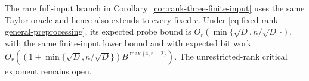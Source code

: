 The rare full-input branch in
Corollary~\ref{cor:rank-three-finite-input} uses the same Taylor
oracle and hence also extends to every fixed $r$. Under
\eqref{eq:fixed-rank-general-preprocessing}, its expected probe
bound is $O_r(\min\{\sqrt D,n/\sqrt D\})$, with the same
finite-input lower bound and with expected bit work
$O_r((1+\min\{\sqrt D,n/\sqrt D\})B^{\max\{4,r+2\}})$.
The unrestricted-rank critical exponent remains open.
